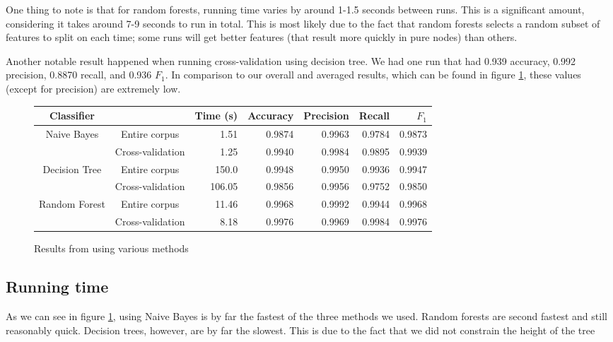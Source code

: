 \documentclass{article} %
\begin{document}
One thing to note is that for random forests, running time varies by around 1-1.5 seconds between runs. This is a significant amount, considering it takes around 7-9 seconds to run in total. This is most likely due to the fact that random forests selects a random subset of features to split on each time; some runs will get better features (that result more quickly in pure nodes) than others. 

Another notable result happened when running cross-validation using decision tree. We had one run that had 0.939 accuracy, 0.992 precision, 0.8870 recall, and 0.936 $F_1$. In comparison to our overall and averaged results, which can be found in figure \ref{fig:table}, these values (except for precision) are extremely low. 

\begin{figure}[h]
  \begin{tabular}[h]{ | c | c | r | r | r | r | r | }
    \hline
    Classifier    &                  & Time (s) & Accuracy & Precision & Recall & $F_1$  \\ \hline
    Naive Bayes   & Entire corpus    & 1.51     & 0.9874   & 0.9963    & 0.9784 & 0.9873 \\ \cline{2-7}
                  & Cross-validation & 1.25     & 0.9940   & 0.9984    & 0.9895 & 0.9939 \\ \hline
    Decision Tree & Entire corpus    & 150.0    & 0.9948   & 0.9950    & 0.9936 & 0.9947 \\ \cline{2-7}
                  & Cross-validation & 106.05   & 0.9856   & 0.9956    & 0.9752 & 0.9850 \\ \hline
    Random Forest & Entire corpus    & 11.46    & 0.9968   & 0.9992    & 0.9944 & 0.9968 \\ \cline{2-7}
                  & Cross-validation & 8.18     & 0.9976   & 0.9969    & 0.9984 & 0.9976 \\ \hline
  \end{tabular}
  \caption{Results from using various methods}
  \label{fig:table}
\end{figure}

\subsection{Running time}
As we can see in figure \ref{fig:table}, using Naive Bayes is by far the fastest of the three methods we used. Random forests are second fastest and still reasonably quick. Decision trees, however, are by far the slowest. This is due to the fact that we did not constrain the height of the tree 
\end{document}
